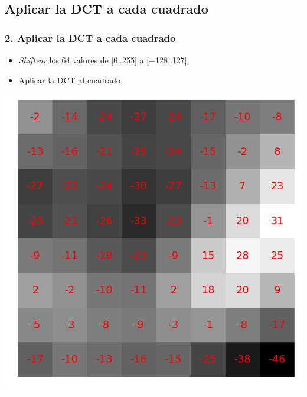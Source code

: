 \documentclass{beamer}
\begin{document}
\subsection{Aplicar la DCT a cada cuadrado}
\begin{frame}
    \frametitle{2. Aplicar la DCT a cada cuadrado}
    \begin{itemize}
        \item \textit{Shiftear} los 64 valores de [0..255] a [$-$128..127].
        \item Aplicar la DCT al cuadrado.
    \end{itemize}

    \includegraphics[scale=0.2]{fig/8x8random.png}

\end{frame}
\end{document}
